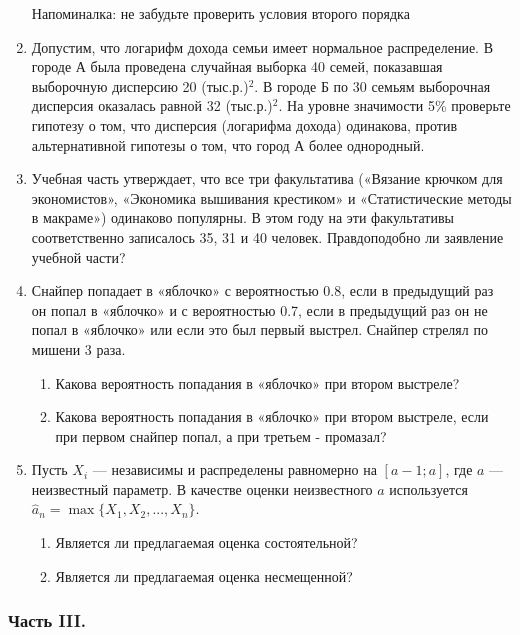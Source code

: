 \begin{enumerate}
Напоминалка: не забудьте проверить условия второго порядка

\item Допустим, что логарифм дохода семьи имеет нормальное распределение. В городе А была проведена случайная выборка 40 семей, показавшая выборочную дисперсию 20 (тыс.р.)$^{2}$. В городе Б по 30 семьям выборочная дисперсия оказалась равной 32 (тыс.р.)$^{2}$.
На уровне значимости 5\% проверьте гипотезу о том, что дисперсия (логарифма дохода) одинакова, против альтернативной гипотезы о том, что город А более однородный.

\item Учебная часть утверждает, что все три факультатива («Вязание крючком для экономистов», «Экономика вышивания крестиком» и «Статистические методы в макраме») одинаково популярны. В этом году на эти факультативы соответственно записалось 35, 31 и 40 человек. Правдоподобно ли заявление учебной части?

\item Снайпер попадает в «яблочко» с вероятностью 0.8, если в предыдущий раз он попал в «яблочко» и с вероятностью 0.7, если в предыдущий раз он не попал в «яблочко» или если это был первый выстрел. Снайпер стрелял по мишени 3 раза.
\begin{enumerate}
\item Какова вероятность попадания в «яблочко» при втором выстреле?
\item Какова вероятность попадания в «яблочко» при втором выстреле, если при первом снайпер попал, а при третьем - промазал?
\end{enumerate}

\item Пусть $X_{i}$ — независимы и распределены равномерно на $[a-1;a]$, где $a$ — неизвестный параметр. В качестве оценки неизвестного $a$ используется $\hat{a}_{n}=\max\{X_{1},X_{2},...,X_{n}\}$.
\begin{enumerate}
\item Является ли предлагаемая оценка состоятельной?
\item Является ли предлагаемая оценка несмещенной?
\end{enumerate}
\end{enumerate}

\subsubsection*{Часть III.}

